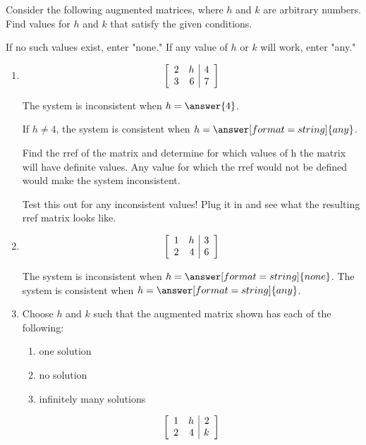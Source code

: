 \documentclass{ximera}
\author{Zack Reed}
\begin{document}
\begin{problem}

    Consider the following augmented matrices, where $h$ and $k$ are arbitrary numbers. Find values for $h$ and $k$ that satisfy the given conditions.

    If no such values exist, enter "none." If any value of $h$ or $k$ will work, enter "any."

    \begin{enumerate}
        \item 
        \begin{equation*}
          \startmat{rr|r}
            2 & h & 4 \\
            3 & 6 & 7
          \stopmat
        \end{equation*}
  
        The system is inconsistent when $h = \answer{4}$.

        If $h\neq 4$, the system is consistent when $h = \answer[format=string]{any}$.

        \begin{hint}
        
            Find the rref of the matrix and determine for which values of h the matrix will have definite values. Any value for which the rref would not be defined would make the system inconsistent.

            Test this out for any inconsistent values! Plug it in and see what the resulting rref matrix looks like.


        \end{hint}
        
        
        \item 
        \begin{equation*}
          \startmat{rr|r}
            1 & h & 3 \\
            2 & 4 & 6
          \stopmat
        \end{equation*}

        The system is inconsistent when $h = \answer[format=string]{none}$. The system is consistent when $h = \answer[format=string]{any}$.
        
        
        \item Choose $h$ and $k$ such that the augmented matrix shown has each of the following:
        \begin{enumerate}
          \item one solution
          \item no solution
          \item infinitely many solutions
        \end{enumerate}
        \begin{equation*}
          \startmat{rr|r}
            1 & h & 2 \\
            2 & 4 & k
          \stopmat
        \end{equation*}
        

\end{enumerate}
\end{problem}
\end{document}
